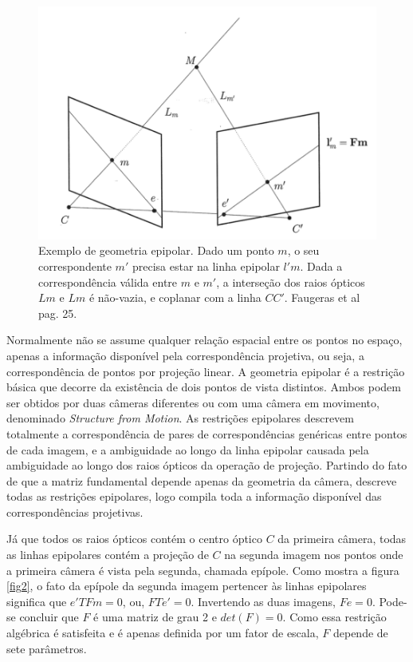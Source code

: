 \begin{figure}
	\centering
		\includegraphics{Imagens/figura2-4.png}
	\caption{Exemplo de geometria epipolar. Dado um ponto $m$, o seu correspondente $m'$ precisa estar na linha epipolar $l'm$. Dada a correspondência válida entre $m$ e $m'$, a interseção dos raios ópticos $Lm$ e $Lm$ é não-vazia, e coplanar com a linha $CC'$. Faugeras et al \cite{Faugeras-Geometry} pag. 25.}
	\label{fig4}
\end{figure}

Normalmente não se assume qualquer relação espacial entre os pontos no espaço, apenas a informação disponível pela correspondência projetiva, ou seja, a correspondência de pontos por projeção linear. A geometria epipolar é a restrição básica que decorre da existência de dois pontos de vista distintos. Ambos podem ser obtidos por duas câmeras diferentes ou com uma câmera em movimento, denominado \textit{Structure from Motion}. As restrições epipolares descrevem totalmente a correspondência de pares de correspondências genéricas entre pontos de cada imagem, e a ambiguidade ao longo da linha epipolar causada pela ambiguidade ao longo dos raios ópticos da operação de projeção. Partindo do fato de que a matriz fundamental depende apenas da geometria da câmera, descreve todas as restrições epipolares, logo compila toda a informação disponível das correspondências projetivas. 

Já que todos os raios ópticos contém o centro óptico $C$ da primeira câmera, todas as linhas epipolares contém a projeção de $C$ na segunda imagem nos pontos onde a primeira câmera é vista pela segunda, chamada epípole. Como mostra a figura \ref{fig2}, o fato da epípole  da segunda imagem pertencer às linhas epipolares significa que $e'TFm = 0$, ou, $FTe' = 0$. Invertendo as duas imagens, $Fe = 0$. Pode-se concluir que $F$ é uma matriz de grau 2 e $det(F) = 0$. Como essa restrição algébrica é satisfeita e é apenas definida por um fator de escala, $F$ depende de sete parâmetros.


